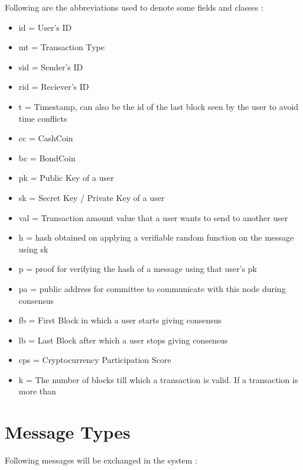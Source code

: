 Following are the abbreviations used to denote some fields and classes :
{
\singlespacing
\begin{itemize}
    \item id = User's ID
	\item mt = Transaction Type
	\item sid = Sender's ID
	\item rid = Reciever's ID
	\item t = Timestamp, can also be the id of the last block seen by the user to avoid time conflicts
	\item cc = CashCoin
	\item bc = BondCoin
	\item pk = Public Key of a user
	\item sk = Secret Key / Private Key of a user
	\item val = Transaction amount value that a user wants to send to another user
	\item h = hash obtained on applying a verifiable random function on the message using sk
	\item p = proof for verifying the hash of a message using that user's pk
	\item pa = public address for committee to communicate with this node during consensus
	\item fb = First Block in which a user starts giving consensus
	\item lb = Last Block after which a user stops giving consensus
	\item cps = Cryptocurrency Participation Score
	\item k = The number of blocks till which a transaction is valid. If a transaction is more than 
\end{itemize}
}

\section{Message Types}

Following messages will be exchanged in the system :

